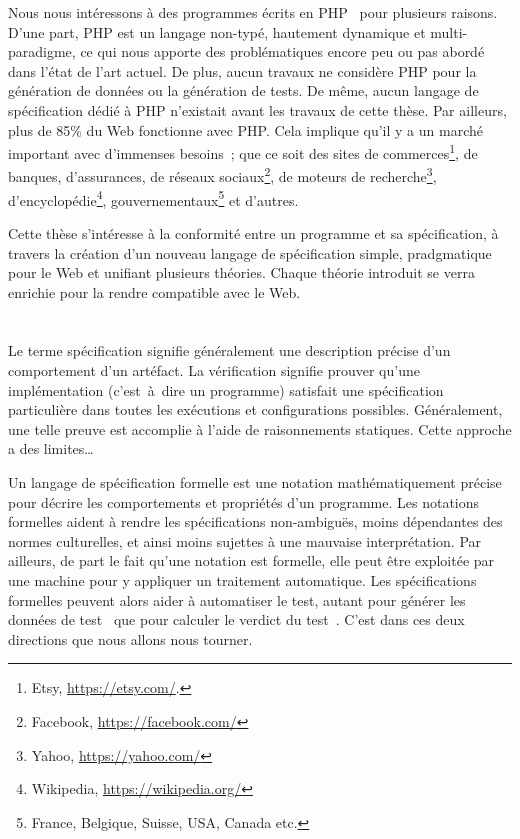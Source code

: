 Nous nous intéressons à des programmes écrits en PHP~ pour plusieurs
raisons. D'une part, PHP est un langage non-typé, hautement dynamique et
multi-paradigme, ce qui nous apporte des problématiques encore peu ou pas abordé
dans l'état de l'art actuel.  De plus, aucun travaux ne considère PHP pour la
génération de données ou la génération de tests. De même, aucun langage de
spécification dédié à PHP n'existait avant les travaux de cette thèse. Par
ailleurs, plus de 85\% du Web fonctionne avec PHP. Cela implique qu'il y a un
marché important avec d'immenses besoins~; que ce soit des sites de
commerces\footnote{Etsy, \url{https://etsy.com/}.}, de banques, d'assurances, de
réseaux sociaux\footnote{Facebook, \url{https://facebook.com/}}, de moteurs de
recherche\footnote{Yahoo, \url{https://yahoo.com/}},
d'encyclopédie\footnote{Wikipedia, \url{https://wikipedia.org/}},
gouvernementaux\footnote{France, Belgique, Suisse, USA, Canada etc.} et
d'autres.

Cette thèse s'intéresse à la conformité entre un programme et sa spécification,
à travers la création d'un nouveau langage de spécification simple, pradgmatique
pour le Web et unifiant plusieurs théories. Chaque théorie introduit se verra
enrichie pour la rendre compatible avec le Web.

\section{}

Le terme {\strong spécification} signifie généralement une description précise
d'un comportement d'un artéfact. La {\strong vérification} signifie prouver
qu'une implémentation (c'est~à~dire un programme) satisfait une spécification
particulière dans toutes les exécutions et configurations possibles.
Généralement, une telle preuve est accomplie à l'aide de raisonnements statiques.
Cette approche a des limites…

Un {\strong langage de spécification} formelle est une notation mathématiquement
précise pour décrire les comportements et propriétés d'un programme. Les
{\strong notations formelles} aident à rendre les spécifications non-ambiguës,
moins dépendantes des normes culturelles, et ainsi moins sujettes à une mauvaise
interprétation. Par ailleurs, de part le fait qu'une notation est formelle, elle
peut être exploitée par une machine pour y appliquer un traitement automatique.
Les spécifications formelles peuvent alors aider à {\strong automatiser le
test}, autant pour générer les données de test~ que pour calculer le verdict du test~.
C'est dans ces deux directions que nous allons nous tourner.

